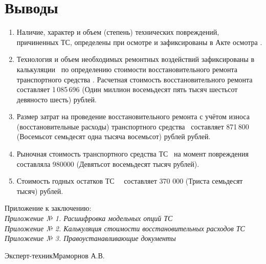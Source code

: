 \section{Выводы}
%
%
\begin{enumerate}
 \item  Наличие, характер и объем (степень) технических повреждений, причиненных ТС, определены при осмотре и зафиксированы в Акте осмотра \NomerDoc.
 \\[-2mm]


\item  Технология и объем необходимых ремонтных воздействий зафиксированы в калькуляции \NomerDoc \, по определению стоимости восстановительного ремонта транспортного средства . Расчетная стоимость восстановительного ремонта составляет 1\,085\,696 (Один миллион восемьдесят пять тысяч шестьсот девяносто шесть) рублей.
\\[-2mm]
\item  Размер затрат на проведение восстановительного ремонта с учётом износа (восстановительные расходы) транспортного средства  \, составляет 871\,800 (Восемьсот семьдесят одна тысяча восемьсот) рублей  рублей.\\[-2mm]   
\item Рыночная стоимость транспортного средства ТС \, на момент повреждения составляла  980000 (Девятьсот восемьдесят тысяч рублей). \\[-2mm]
\item Стоимость годных остатков ТС  \, \, составляет 370 000 (Триста семьдесят тысяч) рублей.
\end{enumerate}
\vspace{15mm}
\relax
Приложение к заключению:\\
\textit{
	Приложение № 1. Расшифровка модельных опций ТС  \\
	Приложение № 2. Калькуляция стоимости восстановительных расходов ТС \\
	Приложение № 3. Правоустанавливающие документы\\
	   }

\vspace{20mm}
{Эксперт-техник}\hfill           {Мраморнов А.В.}


%

%